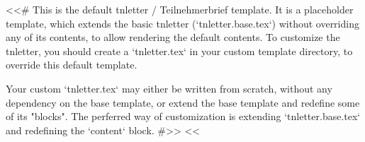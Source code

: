 <<# This is the default tnletter / Teilnehmerbrief template. It is a placeholder template, which extends the basic
    tnletter (`tnletter.base.tex`) without overriding any of its contents, to allow rendering the default contents.
    To customize the tnletter, you should create a `tnletter.tex` in your custom template directory, to override this
    default template.

    Your custom `tnletter.tex` may either be written from scratch, without any dependency on the base template, or
    extend the base template and redefine some of its "blocks". The perferred way of customization is extending
    `tnletter.base.tex` and redefining the `content` block.
#>>
<<%
